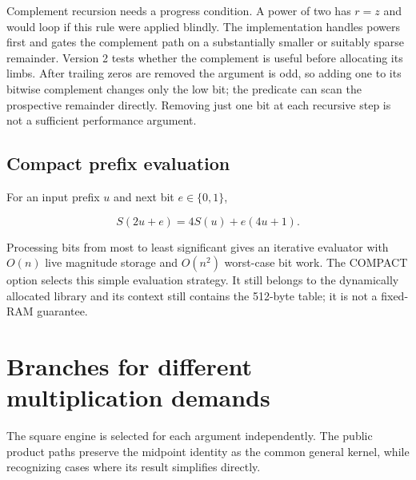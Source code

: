 \documentclass[11pt,a4paper]{article}
\begin{document}
Complement recursion needs a progress condition. A power of two has $r=z$ and would loop if this rule were applied blindly. The implementation handles powers first and gates the complement path on a substantially smaller or suitably sparse remainder. Version 2 tests whether the complement is useful before allocating its limbs. After trailing zeros are removed the argument is odd, so adding one to its bitwise complement changes only the low bit; the predicate can scan the prospective remainder directly. Removing just one bit at each recursive step is not a sufficient performance argument.

\subsection{Compact prefix evaluation}

For an input prefix $u$ and next bit $e\in\{0,1\}$,

\[
S(2u+e)=4S(u)+e(4u+1).
\]

Processing bits from most to least significant gives an iterative evaluator with $O(n)$ live magnitude storage and $O(n^2)$ worst-case bit work. The COMPACT option selects this simple evaluation strategy. It still belongs to the dynamically allocated library and its context still contains the 512-byte table; it is not a fixed-RAM guarantee.

\section{Branches for different multiplication demands}

The square engine is selected for each argument independently. The public product paths preserve the midpoint identity as the common general kernel, while recognizing cases where its result simplifies directly.
\end{document}
